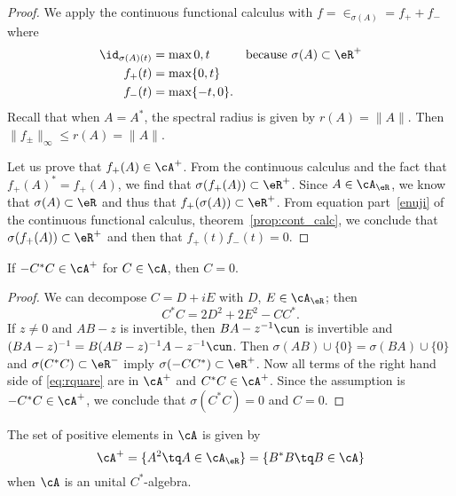 \begin{proof}
	We apply the continuous functional calculus with $f=\in_{\sigma(A)}=f_++f_-$ where
	\begin{equation} \label{eq:rrdeux}
		\begin{aligned}
			\id_{\sigma(A)(t)} & =\max{0,t}       &  & \textrm{because $\sigma(A)\subset\eR^+$} \\
			f_+(t)             & =\max\{ 0,t \}                                                 \\
			f_-(t)             & =\max\{ -t,0 \}.
		\end{aligned}
	\end{equation}
	Recall that when $A=A^*$, the spectral radius is given by $r(A)=\| A \|$. Then $\| f_{\pm} \|_{\infty}\leq r(A)=\| A \|$.

	Let us prove that $f_+(A)\in\cA^+$. From the continuous calculus and the fact that $f_+(A)^*=f_+(A)$, we find that $\sigma(f_+(A))\subset\eR^+$. Since $A\in\cA_{\eR}$, we know that $\sigma(A)\subset\eR$ and thus that $f_+(\sigma(A))\subset\eR^+$. From equation part~\ref{enuji} of the continuous functional calculus, theorem~\ref{prop:cont_calc}, we conclude that $\sigma(f_+(A))\subset\eR^+$ and then that $f_+(t)f_-(t)=0$.
\end{proof}

\begin{lemma} \label{lem:rtrois}
	If $-C^*C\in\cA^+$ for $C\in\cA$, then $C=0$.
\end{lemma}

\begin{proof}
	We can decompose $C=D+iE$ with $D$, $E\in\cA_{\eR}$; then
	\begin{equation}  \label{eq:rquare}
		C^*C=2D^2+2E^2-CC^*.
	\end{equation}
	If $z\neq 0$ and $AB-z$ is invertible, then $BA-z^{-1}\cun$ is invertible and $(BA-z)^{-1}=B(AB-z)^{-1}A-z^{-1}\cun$. Then $\sigma(AB)\cup\{ 0 \}=\sigma(BA)\cup\{ 0 \}$ and $\sigma(C^*C)\subset\eR^-$ imply $\sigma(-CC^*)\subset\eR^+$. Now all terms of the right hand side of \eqref{eq:rquare} are in $\cA^+$ and $C^*C\in\cA^+$. Since the assumption is $-C^*C\in\cA^+$, we conclude that $\sigma(C^*C)=0$ and $C=0$.
\end{proof}


\begin{theorem}     \label{ThoElsPositifsBBstar}
	The set of positive elements in $\cA$ is given by
	\begin{equation}
		\cA^+=\{ A^2\tq A\in\cA_{\eR} \}=\{ B^*B\tq B\in\cA \}
	\end{equation}
	when $\cA$ is an unital $C^*$-algebra.
\end{theorem}

